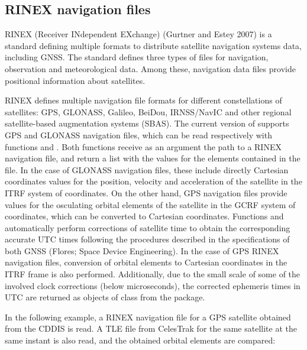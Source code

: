 \hypertarget{rinex-navigation-files}{%
\subsection{RINEX navigation files}\label{rinex-navigation-files}}

RINEX (Receiver INdependent EXchange) (Gurtner and Estey 2007) is a standard defining multiple formats to distribute satellite navigation systems data, including GNSS. The standard defines three types of files for navigation, observation and meteorological data. Among these, navigation data files provide positional information about satellites.

RINEX defines multiple navigation file formats for different constellations of satellites: GPS, GLONASS, Galileo, BeiDou, IRNSS/NavIC and other regional satellite-based augmentation systems (SBAS). The current version of  supports GPS and GLONASS navigation files, which can be read respectively with functions  and . Both functions receive as an argument the path to a RINEX navigation file, and return a list with the values for the elements contained in the file. In the case of GLONASS navigation files, these include directly Cartesian coordinates values for the position, velocity and acceleration of the satellite in the ITRF system of coordinates. On the other hand, GPS navigation files provide values for the osculating orbital elements of the satellite in the GCRF system of coordinates, which can be converted to Cartesian coordinates. Functions  and  automatically perform corrections of satellite time to obtain the corresponding accurate UTC times following the procedures described in the specifications of both GNSS (Flores; Space Device Engineering). In the case of GPS RINEX navigation files, conversion of orbital elements to Cartesian coordinates in the ITRF frame is also performed. Additionally, due to the small scale of some of the involved clock corrections (below microseconds), the corrected ephemeris times in UTC are returned as objects of class  from the  package.

In the following example, a RINEX navigation file for a GPS satellite obtained from the CDDIS is read. A TLE file from CelesTrak for the same satellite at the same instant is also read, and the obtained orbital elements are compared:

